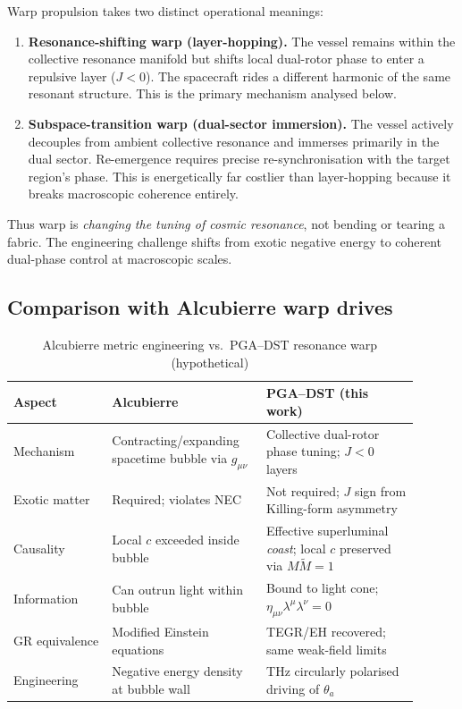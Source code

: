 \documentclass[dvipdfmx,a4paper]{article}
\theoremstyle{definition}
\begin{document}
Warp propulsion takes two distinct operational meanings:

\begin{enumerate}[leftmargin=2em]
  \item \textbf{Resonance-shifting warp (layer-hopping).}
  The vessel remains within the collective resonance manifold but shifts local dual-rotor phase to enter a repulsive layer ($J<0$). The spacecraft rides a different harmonic of the same resonant structure. This is the primary mechanism analysed below.

  \item \textbf{Subspace-transition warp (dual-sector immersion).}
  The vessel actively decouples from ambient collective resonance and immerses primarily in the dual sector. Re-emergence requires precise re-synchronisation with the target region's phase. This is energetically far costlier than layer-hopping because it breaks macroscopic coherence entirely.
\end{enumerate}

Thus warp is \emph{changing the tuning of cosmic resonance}, not bending or tearing a fabric. The engineering challenge shifts from exotic negative energy to coherent dual-phase control at macroscopic scales.

\subsection{Comparison with Alcubierre warp drives}

\begin{table}[ht]
\centering
\caption{Alcubierre metric engineering vs.\ PGA--DST resonance warp (hypothetical)}
\label{tab:alcubierre}
\begin{tabular}{@{}>{\raggedright\arraybackslash}p{0.22\linewidth}>{\raggedright\arraybackslash}p{0.34\linewidth}>{\raggedright\arraybackslash}p{0.34\linewidth}@{}}
\toprule
Aspect & Alcubierre~\cite{alcubierre1994} & PGA--DST (this work) \\
\midrule
Mechanism &
Contracting/expanding spacetime bubble via $g_{\mu\nu}$ &
Collective dual-rotor phase tuning; $J<0$ layers \\
Exotic matter &
Required; violates NEC~\cite{ford2000} &
Not required; $J$ sign from Killing-form asymmetry \\
Causality &
Local $c$ exceeded inside bubble &
Effective superluminal \emph{coast}; local $c$ preserved via $M\widetilde{M}=1$ \\
Information &
Can outrun light within bubble &
Bound to light cone; $\eta_{\mu\nu}\lambda^\mu\lambda^\nu=0$ \\
GR equivalence &
Modified Einstein equations &
TEGR/EH recovered; same weak-field limits \\
Engineering &
Negative energy density at bubble wall &
THz circularly polarised driving of $\theta_a$ \\
\bottomrule
\end{tabular}
\end{table}
\end{document}
